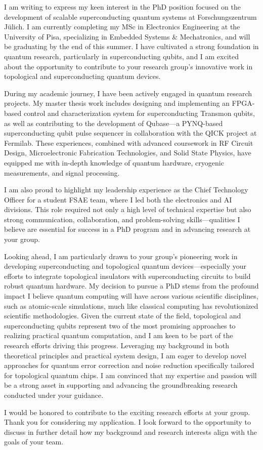 \documentclass[12pt,stdletter,dateno]{newlfm}
\begin{document}
    \begin{newlfm}
        
       I am writing to express my keen interest in the PhD position focused on the development of scalable superconducting quantum systems at Forschungszentrum Jülich. I am currently completing my MSc in Electronics Engineering at the University of Pisa, specializing in Embedded Systems \& Mechatronics, and will be graduating by the end of this summer. I have cultivated a strong foundation in quantum research, particularly in superconducting qubits, and I am excited about the opportunity to contribute to your research group’s innovative work in topological and superconducting quantum devices.
       
       During my academic journey, I have been actively engaged in quantum research projects. My master thesis work includes designing and implementing an FPGA-based control and characterization system for superconducting Transmon qubits, as well as contributing to the development of Qubase—a PYNQ-based superconducting qubit pulse sequencer in collaboration with the QICK project at Fermilab. These experiences, combined with advanced coursework in RF Circuit Design, Microelectronic Fabrication Technologies, and Solid State Physics, have equipped me with in-depth knowledge of quantum hardware, cryogenic measurements, and signal processing.
       
       I am also proud to highlight my leadership experience as the Chief Technology Officer for a student FSAE team, where I led both the electronics and AI divisions. This role required not only a high level of technical expertise but also strong communication, collaboration, and problem-solving skills—qualities I believe are essential for success in a PhD program and in advancing research at your group.
       
       Looking ahead, I am particularly drawn to your group's pioneering work in developing superconducting and topological quantum devices—especially your efforts to integrate topological insulators with superconducting circuits to build robust quantum hardware. My decision to pursue a PhD stems from the profound impact I believe quantum computing will have across various scientific disciplines, such as atomic-scale simulations, much like classical computing has revolutionized scientific methodologies. Given the current state of the field, topological and superconducting qubits represent two of the most promising approaches to realizing practical quantum computation, and I am keen to be part of the research efforts driving this progress. Leveraging my background in both theoretical principles and practical system design, I am eager to develop novel approaches for quantum error correction and noise reduction specifically tailored for topological quantum chips. I am convinced that my expertise and passion will be a strong asset in supporting and advancing the groundbreaking research conducted under your guidance.
       
       I would be honored to contribute to the exciting research efforts at your group. Thank you for considering my application. I look forward to the opportunity to discuss in further detail how my background and research interests align with the goals of your team.
        
    \end{newlfm}
\end{document}
